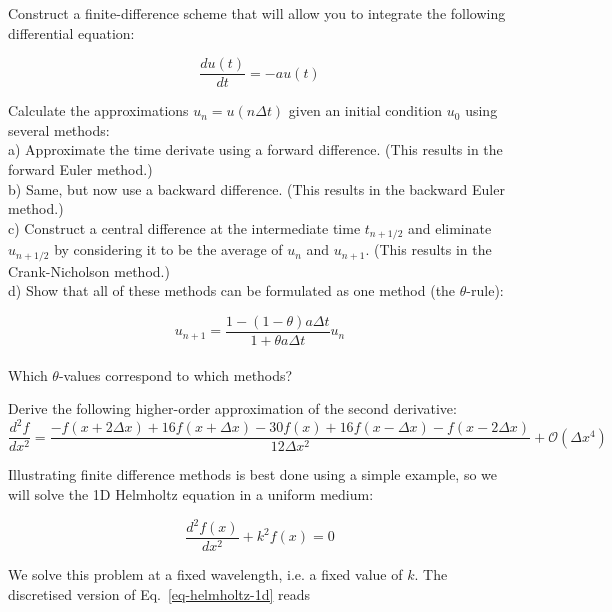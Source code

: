 \begin{exer}
Construct a finite-difference scheme that will allow you to integrate the following differential equation:

$$\frac{du(t)}{dt} = -a u(t)$$

Calculate the approximations $u_n = u(n \Delta t)$ given an initial condition $u_0$ using several methods: \\

a) Approximate the time derivate using a forward difference. (This results in the forward Euler method.) \\

b) Same, but now use a backward difference. (This results in the backward Euler method.)\\

c) Construct a central difference at the intermediate time $t_{n+1/2}$ and eliminate $u_{n+1/2}$ by considering it to be the average of $u_{n}$ and $u_{n+1}$. (This results in the Crank-Nicholson method.) \\

d) Show that all of these methods can be formulated as one method (the $\theta$-rule):

$$u_{n+1} = \frac{1-(1-\theta) a \Delta t}{1+ \theta a \Delta t} u_n$$ \\

Which $\theta$-values correspond to which methods?

\end{exer}



\begin{exer}
Derive the following higher-order approximation of the second derivative:
$$\frac{d^2 f}{d x^2} = \frac{-f(x + 2 \Delta x) + 16 f(x + \Delta x) -30 f(x) + 16 f(x- \Delta x) - f(x - 2 \Delta x)}{12 \Delta x^2} + \mathcal{O}\left(\Delta x^4\right) $$
\end{exer}


\pagebreak



Illustrating finite difference methods is best done using a simple example, so we will solve the 1D Helmholtz equation in a uniform medium:

\begin{equation}
\frac{d^2 f(x)}{d x^2} + k^2 f(x) = 0 \label{eq-helmholtz-1d}
\end{equation} 

We solve this problem at a fixed wavelength, i.e. a fixed value of $k$. The discretised version of Eq.~\ref{eq-helmholtz-1d} reads

